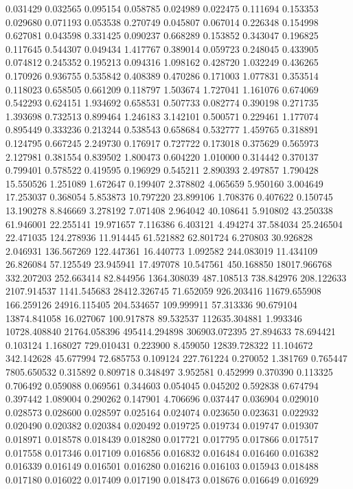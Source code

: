 0.031429
0.032565
0.095154
0.058785
0.024989
0.022475
0.111694
0.153353
0.029680
0.071193
0.053538
0.270749
0.045807
0.067014
0.226348
0.154998
0.627081
0.043598
0.331425
0.090237
0.668289
0.153852
0.343047
0.196825
0.117645
0.544307
0.049434
1.417767
0.389014
0.059723
0.248045
0.433905
0.074812
0.245352
0.195213
0.094316
1.098162
0.428720
1.032249
0.436265
0.170926
0.936755
0.535842
0.408389
0.470286
0.171003
1.077831
0.353514
0.118023
0.658505
0.661209
0.118797
1.503674
1.727041
1.161076
0.674069
0.542293
0.624151
1.934692
0.658531
0.507733
0.082774
0.390198
0.271735
1.393698
0.732513
0.899464
1.246183
3.142101
0.500571
0.229461
1.177074
0.895449
0.333236
0.213244
0.538543
0.658684
0.532777
1.459765
0.318891
0.124795
0.667245
2.249730
0.176917
0.727722
0.173018
0.375629
0.565973
2.127981
0.381554
0.839502
1.800473
0.604220
1.010000
0.314442
0.370137
0.799401
0.578522
0.419595
0.196929
0.545211
2.890393
2.497857
1.790428
15.550526
1.251089
1.672647
0.199407
2.378802
4.065659
5.950160
3.004649
17.253037
0.368054
5.853873
10.797220
23.899106
1.708376
0.407622
0.150745
13.190278
8.846669
3.278192
7.071408
2.964042
40.108641
5.910802
43.250338
61.946001
22.255141
19.971657
7.116386
6.403121
4.494274
37.584034
25.246504
22.471035
124.278936
11.914445
61.521882
62.801724
6.270803
30.926828
2.046931
136.567269
122.447361
16.440773
1.092582
244.083019
11.434109
26.826084
57.125549
23.945941
17.497078
10.547561
450.168850
18017.966768
332.207203
252.663414
82.844956
1364.308039
487.108513
738.842976
208.122633
2107.914537
1141.545683
28412.326745
71.652059
926.203416
11679.655908
166.259126
24916.115405
204.534657
109.999911
57.313336
90.679104
13874.841058
16.027067
100.917878
89.532537
112635.304881
1.993346
10728.408840
21764.058396
495414.294898
306903.072395
27.894633
78.694421
0.103124
1.168027
729.010431
0.223900
8.459050
12839.728322
11.104672
342.142628
45.677994
72.685753
0.109124
227.761224
0.270052
1.381769
0.765447
7805.650532
0.315892
0.809718
0.348497
3.952581
0.452999
0.370390
0.113325
0.706492
0.059088
0.069561
0.344603
0.054045
0.045202
0.592838
0.674794
0.397442
1.089004
0.290262
0.147901
4.706696
0.037447
0.036904
0.029010
0.028573
0.028600
0.028597
0.025164
0.024074
0.023650
0.023631
0.022932
0.020490
0.020382
0.020384
0.020492
0.019725
0.019734
0.019747
0.019307
0.018971
0.018578
0.018439
0.018280
0.017721
0.017795
0.017866
0.017517
0.017558
0.017346
0.017109
0.016856
0.016832
0.016484
0.016460
0.016382
0.016339
0.016149
0.016501
0.016280
0.016216
0.016103
0.015943
0.018488
0.017180
0.016022
0.017409
0.017190
0.018473
0.018676
0.016649
0.016929
